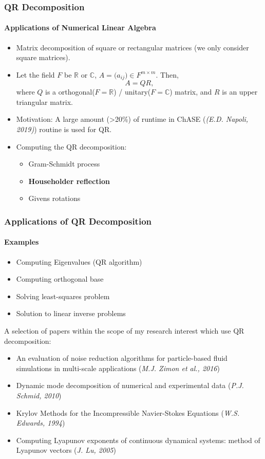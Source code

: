 \begin{frame}
\frametitle{QR Decomposition}
\framesubtitle{Applications of Numerical Linear Algebra}
\begin{itemize}
 \item Matrix decomposition of square or rectangular matrices (we only consider square matrices).
 \item Let the field \(F\) be \(\mathbb{R}\) or \(\mathbb{C}\), \(A =\big( a_{ij} \big) \in F^{m \times m}\). Then,
 \begin{equation}
  A = QR,
 \end{equation}
 where \(Q\) is a orthogonal(\(F=\mathbb{R}\)) / unitary(\(F=\mathbb{C}\)) matrix, and \(R\) is an upper triangular matrix.
 \item Motivation: A large amount (>20\%) of runtime in ChASE (\emph{(E.D. Napoli, 2019)}) routine is used for QR.
 \item Computing the QR decomposition:
 \begin{itemize}
  \item Gram-Schmidt process
  \item \textbf{Householder reflection}
  \item Givens rotations
 \end{itemize}
\end{itemize}
\end{frame}

\begin{frame}
\frametitle{Applications of QR Decomposition}
\framesubtitle{Examples}
\begin{itemize}
 \item Computing Eigenvalues (QR algorithm)
 \item Computing orthogonal base 
 \item Solving least-squares problem
 \item Solution to linear inverse problems
\end{itemize}
A selection of papers within the scope of my research interest which use QR decomposition:
\begin{itemize}
 \item An evaluation of noise reduction algorithms for particle-based fluid simulations in multi-scale applications (\emph{M.J. Zimon et al., 2016})
 \item Dynamic mode decomposition of numerical and experimental data (\emph{P.J. Schmid, 2010})
 \item Krylov Methods for the Incompressible Navier-Stokes Equations (\emph{W.S. Edwards, 1994})
 \item Computing Lyapunov exponents of continuous dynamical systems: method of Lyapunov vectors (\emph{J. Lu, 2005})
\end{itemize}
\end{frame}

